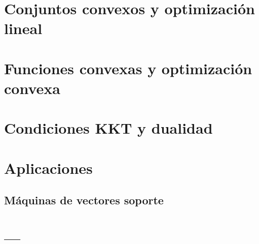 \documentclass[palatino,nochap]{apuntes}
\begin{document}
\chapter{Conjuntos convexos y optimización lineal}



\chapter{Funciones convexas y optimización convexa}


\chapter{Condiciones KKT y dualidad}

\chapter{Aplicaciones}
\section{Máquinas de vectores soporte}

\appendix

\chapter{---}

\printindex
\end{document}
